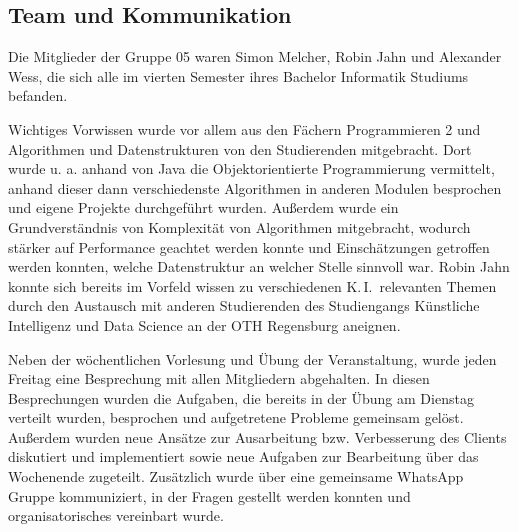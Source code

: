 \documentclass[12pt,a4paper,bibliography=totocnumbered,listof=totocnumbered]{article}
\begin{document}
\subsection{Team und Kommunikation}
Die Mitglieder der Gruppe 05 waren Simon Melcher, Robin Jahn und Alexander Wess, die sich alle im vierten Semester ihres Bachelor Informatik Studiums befanden.

Wichtiges Vorwissen wurde vor allem aus den Fächern Programmieren 2 und Algorithmen und Datenstrukturen von den Studierenden mitgebracht. Dort wurde u. a. anhand von Java die Objektorientierte Programmierung vermittelt, anhand dieser dann verschiedenste Algorithmen in anderen Modulen besprochen und eigene Projekte durchgeführt wurden. Außerdem wurde ein Grundverständnis von Komplexität von Algorithmen mitgebracht, wodurch stärker auf Performance geachtet werden konnte und Einschätzungen getroffen werden konnten, welche Datenstruktur an welcher Stelle sinnvoll war. Robin Jahn konnte sich bereits im Vorfeld wissen zu verschiedenen K.\,I.\ relevanten Themen durch den Austausch mit anderen Studierenden des Studiengangs \glqq Künstliche Intelligenz und Data Science \grqq{} an der OTH Regensburg aneignen.

Neben der wöchentlichen Vorlesung und Übung der Veranstaltung, wurde jeden Freitag eine Besprechung mit allen Mitgliedern abgehalten. In diesen Besprechungen wurden die Aufgaben, die bereits in der Übung am Dienstag verteilt wurden, besprochen und aufgetretene Probleme gemeinsam gelöst. Außerdem wurden neue Ansätze zur Ausarbeitung bzw. Verbesserung des Clients diskutiert und implementiert sowie neue Aufgaben zur Bearbeitung über das Wochenende zugeteilt. Zusätzlich wurde über eine gemeinsame WhatsApp Gruppe kommuniziert, in der Fragen gestellt werden konnten und organisatorisches vereinbart wurde.
\end{document}
